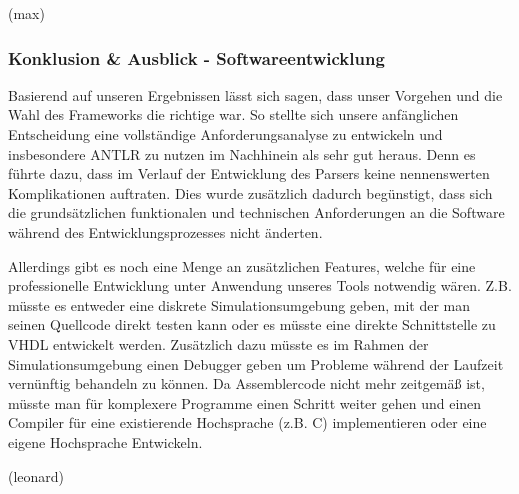 \documentclass[paper=a4,fontsize=12pt,twocolumn]{scrreprt}
\begin{document}
(max)

\subsubsection{Konklusion \& Ausblick - Softwareentwicklung}
Basierend auf unseren Ergebnissen lässt sich sagen, dass unser Vorgehen und die Wahl des Frameworks die richtige war.
So stellte sich unsere anfänglichen Entscheidung eine vollständige Anforderungsanalyse zu entwickeln und insbesondere ANTLR zu nutzen im Nachhinein als sehr gut heraus.
Denn es führte dazu, dass im Verlauf der Entwicklung des Parsers keine nennenswerten Komplikationen auftraten.
Dies wurde zusätzlich dadurch begünstigt, dass sich die grundsätzlichen funktionalen und technischen Anforderungen an die Software während des Entwicklungsprozesses nicht änderten.

Allerdings gibt es noch eine Menge an zusätzlichen Features, welche für eine professionelle Entwicklung unter Anwendung unseres Tools notwendig wären.
Z.B. müsste es entweder eine diskrete Simulationsumgebung geben, mit der man seinen Quellcode direkt testen kann oder es müsste eine direkte Schnittstelle zu VHDL
entwickelt werden.
Zusätzlich dazu müsste es im Rahmen der Simulationsumgebung einen Debugger geben um Probleme während der Laufzeit vernünftig behandeln zu können.
Da Assemblercode nicht mehr zeitgemäß ist, müsste man für komplexere Programme einen Schritt weiter gehen und einen Compiler für eine existierende Hochsprache (z.B. C) implementieren oder eine eigene Hochsprache Entwickeln.


(leonard)


\end{document}
